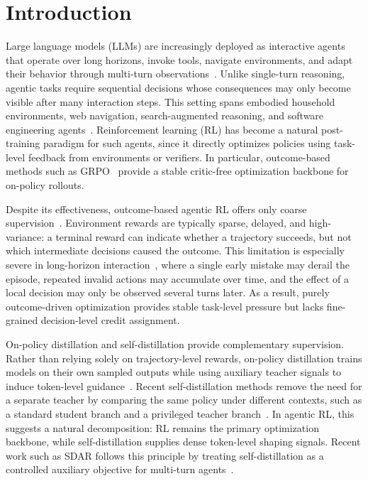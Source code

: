 \documentclass{llmxive}
\begin{document}
\section{Introduction}
Large language models (LLMs) are increasingly deployed as interactive agents that operate over long horizons, invoke tools, navigate environments, and adapt their behavior through multi-turn observations~\citep{jimenez2024swebench,luo2025large,wu2026spark,lu2026sdar}. Unlike single-turn reasoning, agentic tasks require sequential decisions whose consequences may only become visible after many interaction steps. This setting spans embodied household environments, web navigation, search-augmented reasoning, and software engineering agents~\citep{shridhar2020alfworld,yao2022webshop,jin2025searchr1,jimenez2023swebench}. Reinforcement learning (RL) has become a natural post-training paradigm for such agents, since it directly optimizes policies using task-level feedback from environments or verifiers. In particular, outcome-based methods such as GRPO~\citep{shao2024deepseekmath} provide a stable critic-free optimization backbone for on-policy rollouts.


Despite its effectiveness, outcome-based agentic RL offers only coarse supervision~\citep{zhang2025landscape}. Environment rewards are typically sparse, delayed, and high-variance: a terminal reward can indicate whether a trajectory succeeds, but not which intermediate decisions caused the outcome. This limitation is especially severe in long-horizon interaction~\citep{chen2026iterresearch,xu2026odysseyarena}, where a single early mistake may derail the episode, repeated invalid actions may accumulate over time, and the effect of a local decision may only be observed several turns later. As a result, purely outcome-driven optimization provides stable task-level pressure but lacks fine-grained decision-level credit assignment.

On-policy distillation and self-distillation provide complementary supervision. Rather than relying solely on trajectory-level rewards, on-policy distillation trains models on their own sampled outputs while using auxiliary teacher signals to induce token-level guidance~\citep{gu2023minillm,agarwal2024onpolicy}. Recent self-distillation methods remove the need for a separate teacher by comparing the same policy under different contexts, such as a standard student branch and a privileged teacher branch~\citep{zhao2026opsd,he2026sdzero}. In agentic RL, this suggests a natural decomposition: RL remains the primary optimization backbone, while self-distillation supplies dense token-level shaping signals. Recent work such as SDAR follows this principle by treating self-distillation as a controlled auxiliary objective for multi-turn agents~\citep{lu2026sdar}.
\end{document}
